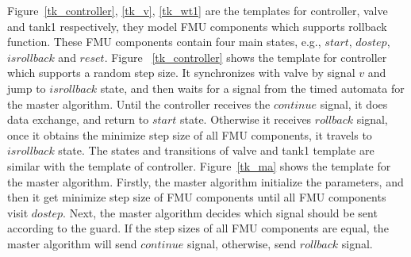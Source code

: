 \begin{figure}[htbp]
\end{figure}

Figure~\ref{tk_controller}, \ref{tk_v}, \ref{tk_wt1} are the templates for controller, valve and tank1 respectively, they model FMU components which supports rollback function. These FMU components contain four main states, e.g., $start$, $dostep$, $isrollback$ and $reset$. Figure~ \ref{tk_controller} shows the template for controller which supports a random step size. It synchronizes with valve by signal $v$ and jump to $isrollback$ state, and then waits for a signal from the timed automata for the master algorithm. Until the controller receives the $continue$ signal, it does data exchange, and return to $start$ state. Otherwise it receives $rollback$ signal, once it obtains the minimize step size of all FMU components, it travels to $isrollback$ state. The states and transitions of valve and tank1 template are similar with the template of controller. Figure~\ref{tk_ma} shows the template for the master algorithm. Firstly, the master algorithm initialize the parameters, and then it get minimize step size of FMU components until all FMU components visit $dostep$. Next, the master algorithm decides which signal should be sent according to the guard. If the step sizes of all FMU components are equal, the master algorithm will send $continue$ signal, otherwise, send $rollback$ signal.

